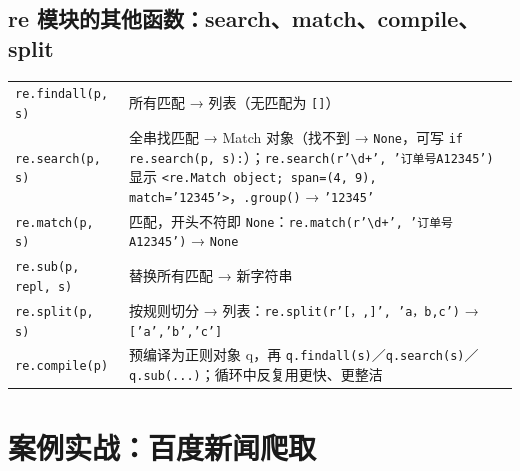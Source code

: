 \subsection{re 模块的其他函数：search、match、compile、split \texorpdfstring{\tagext}{（拓展）}}
\begin{center}\footnotesize\renewcommand{\arraystretch}{1.0}
\begin{tabularx}{\linewidth}{@{}p{3cm}L@{}}
\toprule
\texttt{re.findall(p, s)} & 所有匹配 → 列表（无匹配为 \texttt{[]}）\\
\texttt{re.search(p, s)} & 全串找匹配 → Match 对象（找不到 → \texttt{None}，可写 \texttt{if re.search(p, s):}）；\texttt{re.search(r'\textbackslash d+', '订单号A12345')} 显示 \texttt{<re.Match object; span=(4, 9), match='12345'>}，\texttt{.group()} → \texttt{'12345'} \\
\texttt{re.match(p, s)} & \leavevmode{}匹配，开头不符即 \texttt{None}：\texttt{re.match(r'\textbackslash d+', '订单号A12345')} → \texttt{None} \\
\texttt{re.sub(p, repl, s)} & 替换所有匹配 → 新字符串 \\
\texttt{re.split(p, s)} & 按规则切分 → 列表：\texttt{re.split(r'[，,]', 'a，b,c')} → \texttt{['a','b','c']} \\
\texttt{re.compile(p)} & 预编译为正则对象 q，再 \texttt{q.findall(s)}／\texttt{q.search(s)}／\texttt{q.sub(...)}；循环中反复用更快、更整洁 \\
\bottomrule
\end{tabularx}
\end{center}

\section{案例实战：百度新闻爬取}

